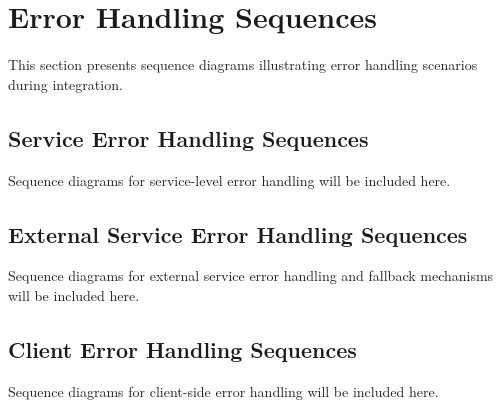\section{Error Handling Sequences}
\label{sec:error_handling_sequences}%

This section presents sequence diagrams illustrating error handling scenarios during integration.

\subsection{Service Error Handling Sequences}
\label{subsec:service_error_handling_sequences}%

Sequence diagrams for service-level error handling will be included here.

\subsection{External Service Error Handling Sequences}
\label{subsec:external_service_error_handling_sequences}%

Sequence diagrams for external service error handling and fallback mechanisms will be included here.

\subsection{Client Error Handling Sequences}
\label{subsec:client_error_handling_sequences}%

Sequence diagrams for client-side error handling will be included here.
